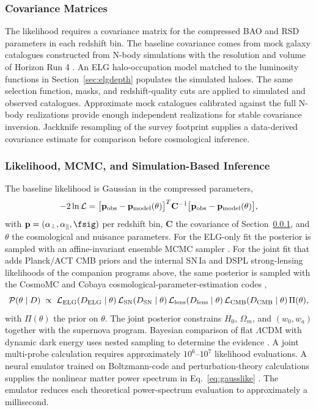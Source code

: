 \subsubsection{Covariance Matrices}\label{sec:covariance}

The likelihood requires a covariance matrix for the compressed BAO and RSD parameters in each redshift bin. The baseline covariance comes from mock galaxy catalogues constructed from N-body simulations with the resolution and volume of Horizon Run 4 \cite{hr4}. An ELG halo-occupation model matched to the luminosity functions in Section~\ref{sec:elgdepth} populates the simulated haloes. The same selection function, masks, and redshift-quality cuts are applied to simulated and observed catalogues. Approximate mock catalogues calibrated against the full N-body realizations provide enough independent realizations for stable covariance inversion. Jackknife resampling of the survey footprint supplies a data-derived covariance estimate for comparison before cosmological inference.

\subsubsection{Likelihood, MCMC, and Simulation-Based Inference}

The baseline likelihood is Gaussian in the compressed parameters,
\begin{equation}
  -2\ln\mathcal{L} =
  \big[\mathbf{p}_{\rm obs}-\mathbf{p}_{\rm model}(\theta)\big]^{T}
  \mathbf{C}^{-1}
  \big[\mathbf{p}_{\rm obs}-\mathbf{p}_{\rm model}(\theta)\big],
  \label{eq:gausslike}
\end{equation}
with $\mathbf{p}=(\alpha_\perp,\alpha_\parallel,\fsig)$ per redshift bin, $\mathbf{C}$ the covariance of Section~\ref{sec:covariance}, and $\theta$ the cosmological and nuisance parameters. For the ELG-only fit the posterior is sampled with an affine-invariant ensemble MCMC sampler \cite{emcee2013}. For the joint fit that adds Planck/ACT CMB priors and the internal SN\,Ia and DSPL strong-lensing likelihoods of the companion programs above, the same posterior is sampled with the CosmoMC and Cobaya cosmological-parameter-estimation codes \cite{lewisbridle2002,torradolewis2021},
\begin{equation}
  \mathcal{P}(\theta\mid D) \;\propto\;
  \mathcal{L}_{\rm ELG}(D_{\rm ELG}\mid\theta)\,
  \mathcal{L}_{\rm SN}(D_{\rm SN}\mid\theta)\,
  \mathcal{L}_{\rm lens}(D_{\rm lens}\mid\theta)\,
  \mathcal{L}_{\rm CMB}(D_{\rm CMB}\mid\theta)\,
  \Pi(\theta),
  \label{eq:jointpost}
\end{equation}
with $\Pi(\theta)$ the prior on $\theta$. The joint posterior constrains $H_0$, $\Omega_m$, and $(w_0,w_a)$ together with the supernova program. Bayesian comparison of flat $\Lambda$CDM with dynamic dark energy uses nested sampling to determine the evidence \cite{polychord2015}. A joint multi-probe calculation requires approximately $10^6$--$10^7$ likelihood evaluations. A neural emulator trained on Boltzmann-code and perturbation-theory calculations supplies the nonlinear matter power spectrum in Eq.~\eqref{eq:gausslike} \cite{cosmopower2022,euclidemulator2021}. The emulator reduces each theoretical power-spectrum evaluation to approximately a millisecond.

